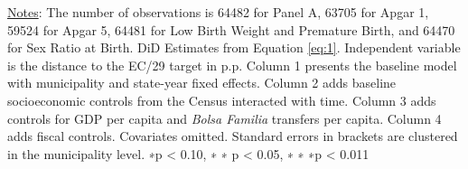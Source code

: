 \begin{table}[h!]
\begin{footnotesize}
\begin{center}
{\begin{threeparttable}[b]
    
    \begin{tablenotes}
  \scriptsize{\underline{Notes}: The number of observations is 64482 for Panel A, 63705 for Apgar 1, 59524 for Apgar 5, 64481 for Low Birth Weight and Premature Birth, and 64470 for Sex Ratio at Birth. DiD Estimates from Equation \ref{eq:1}. Independent variable is the distance to the EC/29 target in p.p. Column 1 presents the baseline model with municipality and state-year fixed effects. Column 2 adds baseline socioeconomic controls from the Census interacted with time. Column 3 adds controls for GDP per capita and \emph{Bolsa Familia} transfers per capita. Column 4 adds fiscal controls. Covariates omitted. Standard errors in brackets are clustered in the municipality level. ∗p < 0.10, ∗ ∗ p < 0.05, ∗ ∗ ∗p < 0.011}
  \end{tablenotes}
    
    
  \label{table:birth}%

\end{threeparttable}
}
\end{center}
\end{footnotesize}
\end{table}